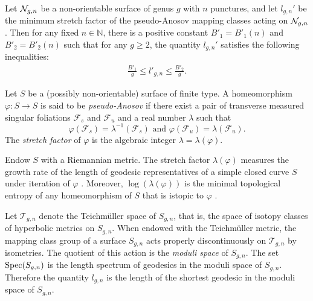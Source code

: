 \begin{thm}\label{thm:stretch1}
  Let $\mathcal{N}_{g,n}$ be a non-orientable surface of genus $g$ with $n$ punctures, and let $l_{g,n}'$ be
  the minimum stretch factor of the pseudo-Anosov mapping classes acting on $\mathcal{N}_{g,n}$.
  Then for any fixed $n \in \mathbb{N}$, there is a positive constant $B'_1 = B'_1(n)$ and $B'_2 = B'_2(n)$ such
  that for any $g \geq 2$, the quantity $l_{g,n}'$ satisfies the following inequalities:
  \begin{align*}
    \frac{B'_1}{g} \leq l'_{g,n} \leq \frac{B'_2}{g}.
  \end{align*}
\end{thm}


 Let $S$ be a (possibly non-orientable) surface of finite type.  A homeomorphism $\varphi:S\rightarrow S$ is said to be {\it pseudo-Anosov} if there exist a pair of transverse measured singular foliations $\mathcal{F}_s$ and $\mathcal{F}_u$ and a real number $\lambda$ such that $$\varphi(\mathcal{F}_s)=\lambda^{-1}(\mathcal{F}_s)\text{ and } \varphi(\mathcal{F}_u)=\lambda(\mathcal{F}_u).$$  The {\it stretch factor} of $\varphi$ is the algebraic integer $\lambda=\lambda(\varphi)$.

Endow $S$ with a Riemannian metric.  The stretch factor $\lambda(\varphi)$ measures the growth rate of the length of geodesic representatives of a simple closed curve $S$ under iteration of $\varphi$ \cite[Proposition 9.21]{FLP}.  Moreover, $\log(\lambda(\varphi))$ is the minimal topological entropy of any homeomorphism of $S$ that is istopic to $\varphi$ \cite[Expos\'e 10]{FLP}.


Let $\mathcal{T}_{g,n}$ denote the Teichm\"uller space of $S_{g,n}$, that is, the space of isotopy classes of hyperbolic metrics on $S_{g,n}$.  
When endowed with the Teichm\"uller metric, the mapping class group of a surface $S_{g,n}$ acts properly discontinuously on $\mathcal{T}_{g,n}$ by isometries.  The quotient of this action is the {\it moduli space} of $S_{g,n}$. The set
$\operatorname{Spec}(S_{g,n})$ is the length spectrum of geodesics in the moduli space of $S_{g,n}$.  Therefore the quantity $l_{g,n}$ is the length of the shortest geodesic in the moduli space of $S_{g,n}$.

